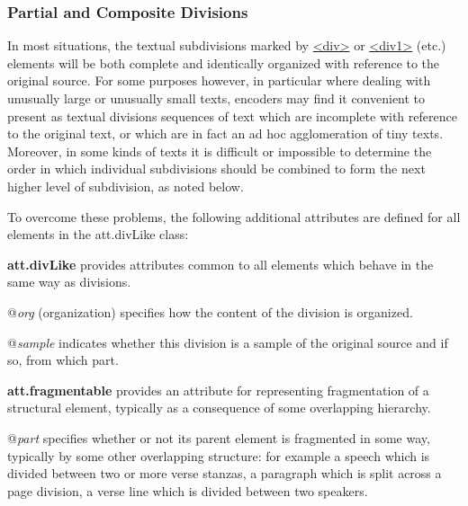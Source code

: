 \subsubsection[{Partial and Composite Divisions}]{Partial and Composite Divisions}\label{DSDIV3X}\par
In most situations, the textual subdivisions marked by \hyperref[TEI.div]{<div>} or \hyperref[TEI.div1]{<div1>} (etc.) elements will be both complete and identically organized with reference to the original source. For some purposes however, in particular where dealing with unusually large or unusually small texts, encoders may find it convenient to present as textual divisions sequences of text which are incomplete with reference to the original text, or which are in fact an ad hoc agglomeration of tiny texts. Moreover, in some kinds of texts it is difficult or impossible to determine the order in which individual subdivisions should be combined to form the next higher level of subdivision, as noted below.\par
To overcome these problems, the following additional attributes are defined for all elements in the \textsf{att.divLike} class: 
\begin{sansreflist}
  
\item [\textbf{att.divLike}] provides attributes common to all elements which behave in the same way as divisions.\hfil\\[-10pt]\begin{sansreflist}
    \item[@{\itshape org}]
  (organization) specifies how the content of the division is organized.
    \item[@{\itshape sample}]
  indicates whether this division is a sample of the original source and if so, from which part.
\end{sansreflist}  
\item [\textbf{att.fragmentable}] provides an attribute for representing fragmentation of a structural element, typically as a consequence of some overlapping hierarchy.\hfil\\[-10pt]\begin{sansreflist}
    \item[@{\itshape part}]
  specifies whether or not its parent element is fragmented in some way, typically by some other overlapping structure: for example a speech which is divided between two or more verse stanzas, a paragraph which is split across a page division, a verse line which is divided between two speakers.
\end{sansreflist}  
\end{sansreflist}
